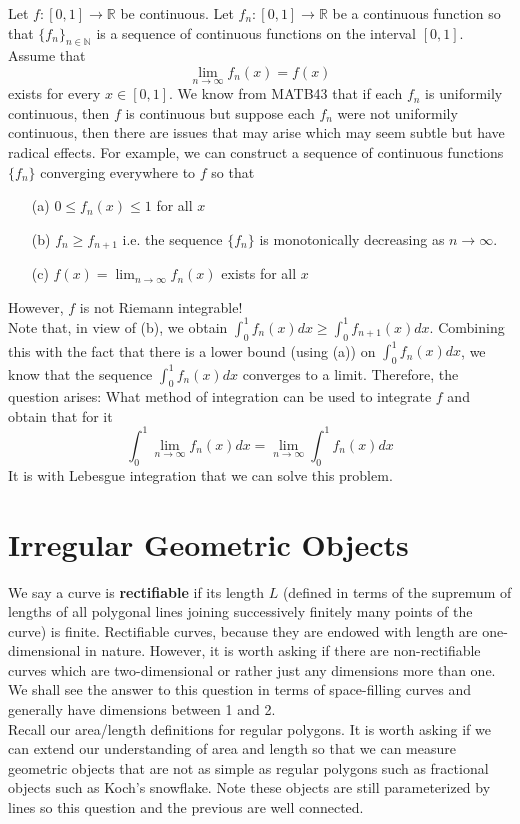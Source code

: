 \documentclass[a4paper, 11pt]{book}
\theoremstyle{definition}
\theoremstyle{remark}
\begin{document}
    Let $f: [0,1] \to \mathbb{R}$ be continuous. Let $f_n: [0,1] \to \mathbb{R}$ be a continuous function so that
    $\{f_n\}_{n\in\mathbb{N}}$ is a sequence of continuous functions on the interval $[0,1]$. Assume that
    \[ \lim_{n\to\infty} f_n(x) = f(x) \]
    exists for every $x\in[0,1]$. We know from MATB43 that if each $f_n$ is uniformily continuous, then $f$ is continuous but suppose
    each $f_n$ were not uniformily continuous, then there are issues that may arise which may seem subtle but have radical effects.
    For example, we can construct a sequence of continuous functions $\{f_n\}$ converging everywhere to $f$ so that
    \begin{enumerate}
        \item[(a)] $0\leq f_n(x)\leq 1$ for all $x$
        \item[(b)] $f_n \geq f_{n+1}$ i.e. the sequence $\{f_n\}$ is monotonically decreasing as $n\to\infty$.
        \item[(c)] $f(x) = \lim_{n\to\infty} f_n(x)$ exists for all $x$
    \end{enumerate}
    However, $f$ is not Riemann integrable!\\
    Note that, in view of (b), we obtain $\int_0^1 f_n(x)dx \geq \int_0^1 f_{n+1}(x)dx$. Combining this with the fact that there is
    a lower bound (using (a)) on $\int_0^1 f_n(x)dx$, we know that the sequence $\int_0^1 f_n(x)dx$ converges to a limit.
    Therefore, the question arises: What method of integration can be used to integrate $f$ and obtain that for it
    \[ \int_0^1 \lim_{n\to\infty} f_n(x)dx = \lim_{n\to\infty} \int_0^1 f_n(x)dx \]
    It is with Lebesgue integration that we can solve this problem.

    \section{Irregular Geometric Objects}
    We say a curve is \textbf{rectifiable} if its length $L$ (defined in terms of the supremum of lengths of all polygonal lines
    joining successively finitely many points of the curve) is finite. Rectifiable curves, because they are endowed with length are
    one-dimensional in nature. However, it is worth asking if there are non-rectifiable curves which are two-dimensional or rather just
    any dimensions more than one. We shall see the answer to this question in terms of space-filling curves and generally have dimensions
    between 1 and 2.\\
    Recall our area/length definitions for regular polygons. It is worth asking if we can extend our understanding of area and length
    so that we can measure geometric objects that are not as simple as regular polygons such as fractional objects such as
    Koch's snowflake. Note these objects are still parameterized by lines so this question and the previous are well connected.
\end{document}

